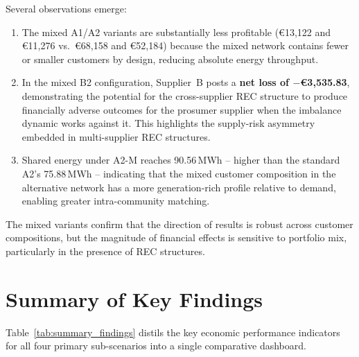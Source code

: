 Several observations emerge:

\begin{enumerate}
    \item The mixed A1/A2 variants are substantially less profitable
          (€13{,}122 and €11{,}276 vs.\ €68{,}158 and €52{,}184) because the
          mixed network contains fewer or smaller customers by design, reducing
          absolute energy throughput.

    \item In the mixed B2 configuration, Supplier~B posts a \textbf{net loss of
          $-$€3{,}535.83}, demonstrating the potential for the cross-supplier REC
          structure to produce financially adverse outcomes for the prosumer
          supplier when the imbalance dynamic works against it.  This highlights
          the supply-risk asymmetry embedded in multi-supplier REC structures.

    \item Shared energy under A2-M reaches 90.56\,MWh -- higher than the
          standard A2's 75.88\,MWh -- indicating that the mixed customer
          composition in the alternative network has a more generation-rich
          profile relative to demand, enabling greater intra-community matching.
\end{enumerate}

The mixed variants confirm that the direction of results is robust across
customer compositions, but the magnitude of financial effects is sensitive to
portfolio mix, particularly in the presence of REC structures.


\section{Summary of Key Findings}
\label{sec:results_summary}

Table~\ref{tab:summary_findings} distils the key economic performance indicators
for all four primary sub-scenarios into a single comparative dashboard.

